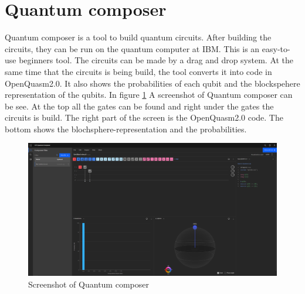 \section{Quantum composer}
\label{sec:Composer}
Quantum composer is a tool to build quantum circuits. After building the circuits, they can be run on the quantum computer at IBM. This is an easy-to-use beginners tool. The circuits can be made by a drag and drop system.
At the same time that the circuits is being build, the tool converts it into code in OpenQuasm2.0. It also shows the probabilities of each qubit and the blockspehere representation of the qubits.
In figure \ref{fig:Quantum composer} A screenshot of Quantum composer can be see. At the top all the gates can be found and right under the gates the circuits is build. The right part of the screen is the OpenQuasm2.0 code.
The bottom shows the blochsphere-representation and the probabilities.

\begin{figure} [h]
    \centering
    \includegraphics[width=\textwidth]{img/composer.PNG}
        \caption{Screenshot of Quantum composer}
        \label{fig:Quantum composer}
\end{figure}